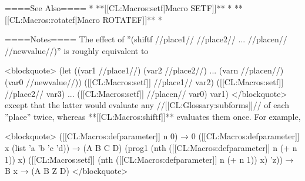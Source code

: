 ====See Also====
  * **[[CL:Macros:setf|Macro SETF]]**
  * **[[CL:Macros:rotatef|Macro ROTATEF]]**
  * {\secref\GeneralizedReference}

====Notes====
The effect of ''(shiftf //place1// //place2// ... //placen// //newvalue//)'' is roughly equivalent to

<blockquote> (let ((var1 //place1//) (var2 //place2//) ... (varn //placen//) (var0 //newvalue//)) ([[CL:Macros:setf]] //place1// var2) ([[CL:Macros:setf]] //place2// var3) ... ([[CL:Macros:setf]] //placen// var0) var1) </blockquote> except that the latter would evaluate any //[[CL:Glossary:subforms]]// of each ''place'' twice, whereas **[[CL:Macros:shiftf]]** evaluates them once. For example,

<blockquote> ([[CL:Macros:defparameter]] n 0) → 0 ([[CL:Macros:defparameter]] x (list 'a 'b 'c 'd)) → (A B C D) (prog1 (nth ([[CL:Macros:defparameter]] n (+ n 1)) x) ([[CL:Macros:setf]] (nth ([[CL:Macros:defparameter]] n (+ n 1)) x) 'z)) → B x → (A B Z D) </blockquote>

 
